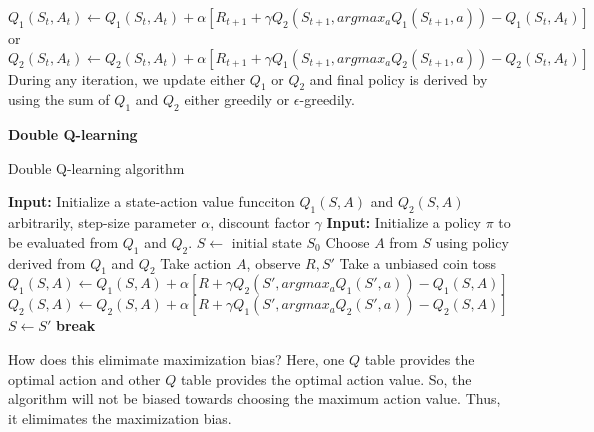 \documentclass[../main.tex]{subfiles}
\begin{document}
\begin{equation}
Q_1(S_t, A_t) \leftarrow Q_1(S_t, A_t) + \alpha \left[ R_{t+1} + \gamma Q_2(S_{t+1}, argmax_a Q_1(S_{t+1}, a)) - Q_1(S_t, A_t) \right] \nonumber
\end{equation}
or 
\begin{equation}
Q_2(S_t, A_t) \leftarrow Q_2(S_t, A_t) + \alpha \left[ R_{t+1} + \gamma Q_1(S_{t+1}, argmax_a Q_2(S_{t+1}, a)) - Q_2(S_t, A_t) \right] \nonumber
\end{equation}
During any iteration, we update either $Q_1$ or $Q_2$ and final policy is derived by using the sum of $Q_1$ and $Q_2$ either greedily or $\epsilon$-greedily.


\textbf{Double Q-learning}

\begin{algorithm}[H]
\caption{Double Q-learning algorithm}
\begin{algorithmic}[1]
    \State \textbf{Input:} Initialize a state-action value funcciton $Q_1(S, A)$ and $Q_2(S, A)$ arbitrarily, step-size parameter $\alpha$, discount factor $\gamma$
\State \textbf{Input:} Initialize a policy $\pi$ to be evaluated from $Q_1$ and $Q_2$.
\State  $S \leftarrow$ initial state $S_0$
\State Choose $A$ from $S$ using policy derived from $Q_1$ and $Q_2$ 
\State  Take action $A$, observe $R, S'$
\State Take a unbiased coin toss
\State  $Q_1(S, A) \leftarrow Q_1(S, A) + \alpha \left[ R + \gamma Q_2(S', argmax_a Q_1(S', a)) - Q_1(S, A) \right]$
\Else
\State  $Q_2(S, A) \leftarrow Q_2(S, A) + \alpha \left[ R + \gamma Q_1(S', argmax_a Q_2(S', a)) - Q_2(S, A) \right]$
\EndIf
\State  $S \leftarrow S'$
\State \textbf{break}
\EndIf
\EndFor
\EndWhile
\end{algorithmic}
\end{algorithm}

How does this elimimate maximization bias? Here, one $Q$ table provides the optimal action and other $Q$ table provides the optimal action value. So, the algorithm will not be biased towards choosing the maximum action value. Thus, it elimimates the maximization bias.
\end{document}
